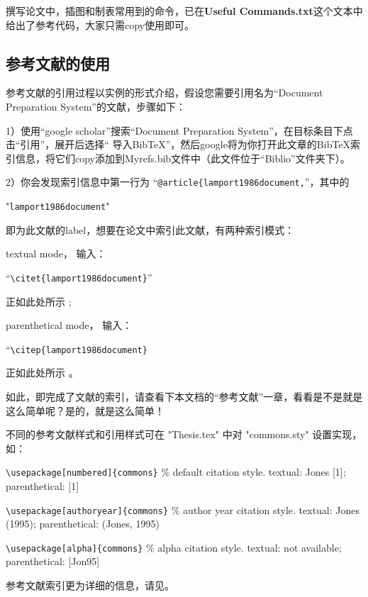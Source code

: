 撰写论文中，插图和制表常用到的命令，已在\textbf{Useful Commands.txt}这个文本中给出了参考代码，大家只需copy使用即可。

\subsection{参考文献的使用}

参考文献的引用过程以实例的形式介绍，假设您需要引用名为“Document Preparation System”的文献，步骤如下：

1）使用“google scholar”搜索“Document Preparation System”，在目标条目下点击“引用”，展开后选择“ 导入BibTeX”，然后google将为你打开此文章的BibTeX索引信息，将它们copy添加到Myrefs.bib文件中（此文件位于“Biblio”文件夹下）。

2）你会发现索引信息中第一行为 “\verb|@article{lamport1986document,|”，其中的 
    
    "\verb|lamport1986document|" 
    
即为此文献的label，想要在论文中索引此文献，有两种索引模式：

textual mode， 输入：

“\verb|\citet{lamport1986document}|”

正如此处所示 \citet{lamport1986document}; 

parenthetical mode， 输入：

“\verb|\citep{lamport1986document}|

正如此处所示 \citep{lamport1986document}。

如此，即完成了文献的索引，请查看下本文档的“参考文献”一章，看看是不是就是这么简单呢？是的，就是这么简单！

不同的参考文献样式和引用样式可在 "Thesis.tex" 中对 "commons.sty" 设置实现，如：

\verb+\usepackage[numbered]{commons}+ $\%$ default citation style. textual: Jones [1]; parenthetical: [1]

\verb+\usepackage[authoryear]{commons}+ $\%$ author year citation style. textual: Jones (1995); parenthetical: (Jones, 1995)

\verb+\usepackage[alpha]{commons}+ $\%$ alpha citation style. textual: not available; parenthetical: [Jon95]

参考文献索引更为详细的信息，请见\citep{wikibook2014latex}。
